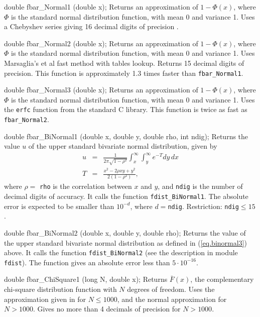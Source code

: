 double fbar_Normal1 (double x);
\endcode
  \tab
  Returns an approximation of $1 - \Phi(x)$,
  where $\Phi$ is the standard normal distribution function,
  with mean 0 and variance 1.
  Uses a Chebyshev series giving 16 decimal digits of
  precision \cite{tSCH78a}.
 \endtab
\code


double fbar_Normal2 (double x);
\endcode
  \tab
  Returns an approximation of $1 - \Phi(x)$,  where $\Phi$ is the standard
  normal distribution function, with mean 0 and variance 1.
   Uses Marsaglia's et al \cite{rMAR94b} fast method
  with tables lookup. Returns 15 decimal digits of precision.
  This function is approximately 1.3 times faster than {\tt fbar\_Normal1}.
 \endtab
\code


double fbar_Normal3 (double x);
\endcode
  \tab
  Returns an approximation of $1 - \Phi(x)$,
  where $\Phi$ is the standard normal distribution function,
  with mean 0 and variance 1.
  Uses the {\tt erfc} function from the standard C library. This function
  is twice as fast as {\tt fbar\_Normal2}.
 \endtab
\code


double fbar_BiNormal1 (double x, double y, double rho, int ndig);
\endcode
  \tab
  Returns the value $u$ of the upper standard bivariate normal distribution,
  given by
\begin{eqnarray}
     u &=&  \frac{1}{2\pi\sqrt{1 - \rho^2}} \int^{\infty}_x
              \int^{\infty}_y e^{-T} dy\, dx  \label{eq.binormal3} \\[5pt]
     T &=& \frac{x^2 -2\rho x y + y^2}{2(1-\rho^2)}, \nonumber
\end{eqnarray}
  where $\rho = ${ \tt rho} is the correlation between $x$ and $y$, and
 \texttt{ndig} is the number of decimal digits of accuracy.
  It calls the function {\tt fdist\_BiNormal1}. The absolute error
  is expected to be smaller than $10^{-d}$, where $d={}$\texttt{ndig}.
  Restriction: \texttt{ndig}${} \le 15$.
 \endtab
\code


double fbar_BiNormal2 (double x, double y, double rho);
\endcode
  \tab
  Returns the value of the upper standard bivariate normal distribution as
  defined in (\ref{eq.binormal3}) above.
  It calls the function {\tt fdist\_BiNormal2} (see the description in
   module {\tt fdist}). The function gives
   an absolute error less than $5 \cdot 10^{-16}$.
 \endtab
\code


double fbar_ChiSquare1 (long N, double x);
\endcode
  \tab
    Returns $\bar F(x)$, the complementary
   chi-square distribution function with
   $N$ degrees of freedom.
  Uses the approximation given in \cite[p.116]{tKEN80a} for $N\le 1000$,
  and the normal approximation for $N > 1000$. Gives no more than 4
  decimals of precision for $N > 1000$.
 \endtab
\code


